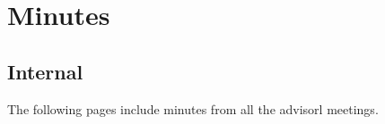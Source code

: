 \chapter{Minutes}

\section{Internal}
The following pages include minutes from all the advisorl meetings.
\newpage
\begin{figure}[htb]

\end{figure}

\newpage

\begin{figure}[htb]

\end{figure}

\newpage

\begin{figure}[htb]

\end{figure}

\newpage

\begin{figure}[htb]

\end{figure}

\newpage

\begin{figure}[htb]

\end{figure}

\newpage

\begin{figure}[htb]

\end{figure}

\newpage

\begin{figure}[htb]

\end{figure}

\newpage

\begin{figure}[htb]

\end{figure}

\newpage

\begin{figure}[htb]

\end{figure}

